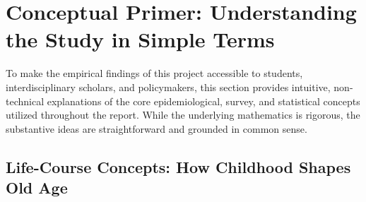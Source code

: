 
\section{Conceptual Primer: Understanding the Study in Simple Terms}

To make the empirical findings of this project accessible to students, interdisciplinary scholars, and policymakers, this section provides intuitive, non-technical explanations of the core epidemiological, survey, and statistical concepts utilized throughout the report. While the underlying mathematics is rigorous, the substantive ideas are straightforward and grounded in common sense.

\subsection{Life-Course Concepts: How Childhood Shapes Old Age}

